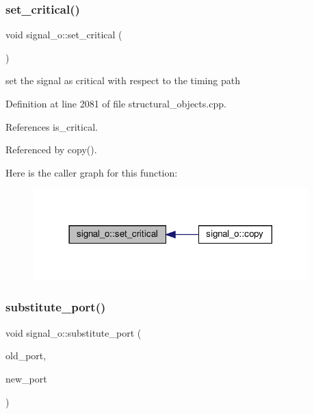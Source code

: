 \mbox{\label{classsignal__o_a3fcdae87bd77e9146c2643fd717079ac}} 
\subsubsection{\texorpdfstring{set\+\_\+critical()}{set\_critical()}}
{\footnotesize\ttfamily void signal\+\_\+o\+::set\+\_\+critical (\begin{DoxyParamCaption}{ }\end{DoxyParamCaption})}



set the signal as critical with respect to the timing path 



Definition at line 2081 of file structural\+\_\+objects.\+cpp.



References is\+\_\+critical.



Referenced by copy().

Here is the caller graph for this function\+:
\nopagebreak
\begin{figure}[H]
\begin{center}
\leavevmode
\includegraphics[width=302pt]{db/d5c/classsignal__o_a3fcdae87bd77e9146c2643fd717079ac_icgraph}
\end{center}
\end{figure}
\mbox{\label{classsignal__o_a0d121c5524b4f35e710da41023cb780a}} 
\subsubsection{\texorpdfstring{substitute\+\_\+port()}{substitute\_port()}}
{\footnotesize\ttfamily void signal\+\_\+o\+::substitute\+\_\+port (\begin{DoxyParamCaption}\item[{\hyperlink{structural__objects_8hpp_a8ea5f8cc50ab8f4c31e2751074ff60b2}{structural\+\_\+object\+Ref}}]{old\+\_\+port,  }\item[{\hyperlink{structural__objects_8hpp_a8ea5f8cc50ab8f4c31e2751074ff60b2}{structural\+\_\+object\+Ref}}]{new\+\_\+port }\end{DoxyParamCaption})}



